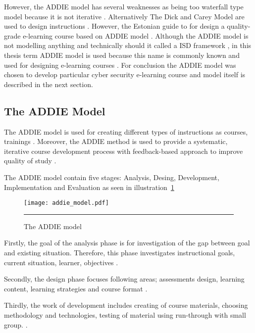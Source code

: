  However, the \gls{ADDIE} model has several weaknesses as being too waterfall type model because it is not iterative \citep{website:weakesses_of_ADDIE_model}. Alternatively The Dick and Carey Model are used to design instructions \citep{dick2005systematic}. However, the Estonian guide to for design a quality-grade e-learning course based on \gls{ADDIE} model \citep{OppeArenduskeskus2010}. Although the ADDIE model is not modelling anything and technically should it called a \gls{ISD} framework \citep{bichelmeyer2004addie}, in this thesis term ADDIE model is used because this name is commonly known and used for designing e-learning courses \citep{bichelmeyer2004addie, OppeArenduskeskus2010}.
For conclusion the \gls{ADDIE} model was chosen to develop particular cyber security e-learning course and model itself is described in the next section.

\subsection{The ADDIE Model}

The \gls{ADDIE} model is used for creating different types of instructions as courses, trainings \citep{website:addie, lohr1998using}. Moreover, the ADDIE method is  used to provide a systematic, iterative course development process with feedback-based approach to improve quality of study \citep{website:using_addie}.

The ADDIE model contain five stages: Analysis, Desing, Development, Implementation and Evaluation as seen in illustration~\ref{figure:the addie model} \citep{website:addie}



\begin{figure}[H]
 \centering 
 \texttt{[image: addie\_model.pdf]}
 \rule{35em}{0.5pt} 
 \caption{The ADDIE model} 
 \label{figure:the addie model} 
\end{figure}

Firstly, the goal of the analysis phase is for investigation of the gap between goal and
existing situation. Therefore, this phase investigates instructional goals, current situation, learner, objectives \citep{chen2007learning, website:addie}.

Secondly, the design phase focuses following areas; assessments design, learning content, learning strategies and course format \citep{chen2007learning, website:addie}.


Thirdly, the work of development includes creating of course materials, choosing methodology and technologies, testing of material using run-through with small group. \citep{OppeArenduskeskus2010, website:addie, chen2007learning}.


